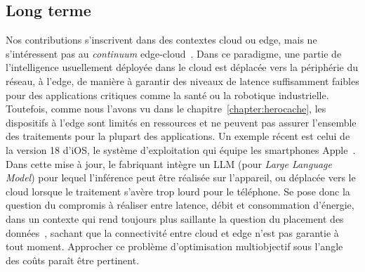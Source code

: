 \subsection{Long terme}

Nos contributions s'inscrivent dans des contextes cloud ou edge, mais ne s'intéressent pas au \textit{continuum} edge-cloud~\cite{jansenSPECRGReferenceArchitecture2023}. Dans ce paradigme, une partie de l'intelligence usuellement déployée dans le cloud est déplacée vers la périphérie du réseau, à l'edge, de manière à garantir des niveaux de latence suffisamment faibles pour des applications critiques comme la santé ou la robotique industrielle. Toutefois, comme nous l'avons vu dans le chapitre~\ref{chapter:herocache}, les dispositifs à l'edge sont limités en ressources et ne peuvent pas assurer l'ensemble des traitements pour la plupart des applications. Un exemple récent est celui de la version 18 d'iOS, le système d'exploitation qui équipe les smartphones Apple~\cite{WhatAppleIntelligence}. Dans cette mise à jour, le fabriquant intègre un \gls{LLM} (pour \textit{Large Language Model}) pour lequel l'inférence peut être réalisée sur l'appareil, ou déplacée vers le cloud lorsque le traitement s'avère trop lourd pour le téléphone. Se pose donc la question du compromis à réaliser entre latence, débit et consommation d'énergie, dans un contexte qui rend toujours plus saillante la question du placement des données~\cite{chikhaouiMultiobjectiveOptimizationData2021a}, sachant que la connectivité entre cloud et edge n'est pas garantie à tout moment. Approcher ce problème d'optimisation multiobjectif sous l'angle des coûts paraît être pertinent.

